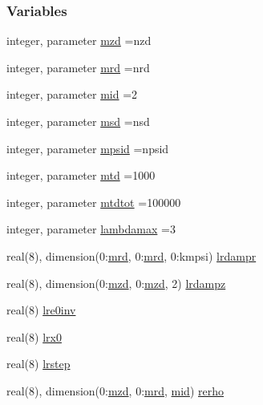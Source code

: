 \subsubsection*{Variables}
\begin{DoxyCompactItemize}
\item 
integer, parameter \hyperlink{namespacelinresponse_a61b4047baf19d042872d8ceed0416b1e}{mzd} =nzd
\item 
integer, parameter \hyperlink{namespacelinresponse_a0f1c9b37ba70c482d06a765ac59da516}{mrd} =nrd
\item 
integer, parameter \hyperlink{namespacelinresponse_a5ce6645ed59d7c6845a4eaa13cc060ed}{mid} =2
\item 
integer, parameter \hyperlink{namespacelinresponse_a9d6252ae4cde6390991667cd981f7a5a}{msd} =nsd
\item 
integer, parameter \hyperlink{namespacelinresponse_a7d139c0bde0ee62d24b2906275e8953a}{mpsid} =npsid
\item 
integer, parameter \hyperlink{namespacelinresponse_abd8480f5e3944238c71b36aa4facd7b5}{mtd} =1000
\item 
integer, parameter \hyperlink{namespacelinresponse_a6bf64170d4100fc94f7b85375e147082}{mtdtot} =100000
\item 
integer, parameter \hyperlink{namespacelinresponse_a799a3287dd27fc3b00e5f050ed9c95df}{lambdamax} =3
\item 
real(8), dimension(0\+:\hyperlink{namespacelinresponse_a0f1c9b37ba70c482d06a765ac59da516}{mrd}, 0\+:\hyperlink{namespacelinresponse_a0f1c9b37ba70c482d06a765ac59da516}{mrd}, 0\+:kmpsi) \hyperlink{namespacelinresponse_a77986a25dd6b5d30220a7f3294c79016}{lrdampr}
\item 
real(8), dimension(0\+:\hyperlink{namespacelinresponse_a61b4047baf19d042872d8ceed0416b1e}{mzd}, 0\+:\hyperlink{namespacelinresponse_a61b4047baf19d042872d8ceed0416b1e}{mzd}, 2) \hyperlink{namespacelinresponse_a2b636d6bb28e43387430e6b07d33fa15}{lrdampz}
\item 
real(8) \hyperlink{namespacelinresponse_ae037dc32bfb1ea3484f9930a392110ec}{lre0inv}
\item 
real(8) \hyperlink{namespacelinresponse_a955e3100803d9f5ebd0fc30925fb35ff}{lrx0}
\item 
real(8) \hyperlink{namespacelinresponse_aa17805959857e7f4d64f4b75f392dd79}{lrstep}
\item 
real(8), dimension(0\+:\hyperlink{namespacelinresponse_a61b4047baf19d042872d8ceed0416b1e}{mzd}, 0\+:\hyperlink{namespacelinresponse_a0f1c9b37ba70c482d06a765ac59da516}{mrd}, \hyperlink{namespacelinresponse_a5ce6645ed59d7c6845a4eaa13cc060ed}{mid}) \hyperlink{namespacelinresponse_ac1edf3417df4c7be9af93e89cce968a8}{rerho}

\end{DoxyCompactItemize}
